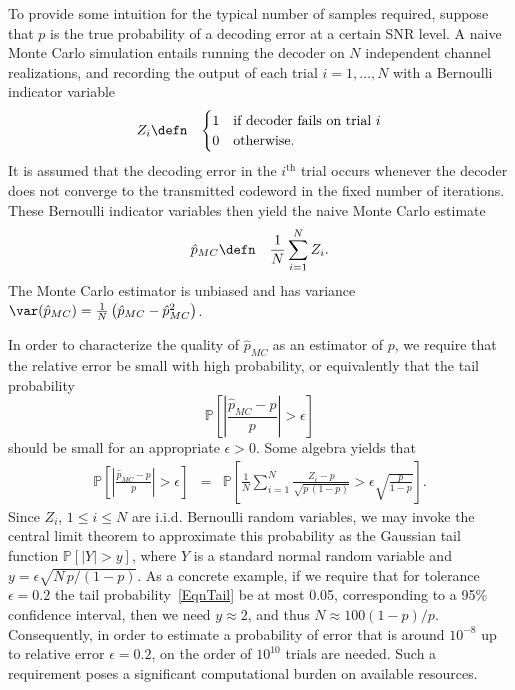 To provide some intuition for the typical number of samples required,
suppose that $p$ is the true probability of a decoding error at a
certain SNR level. A naive Monte Carlo simulation entails running the
decoder on $N$ independent channel realizations, and recording the
output of each trial $i= 1, \ldots, N$ with a Bernoulli indicator
variable
\begin{eqnarray*}
Z_i & \defn & \begin{cases} 1 & \mbox{if decoder fails on trial $i$} \\
                         0 & \mbox{otherwise.}
       \end{cases}
\end{eqnarray*}
It is assumed that the decoding error in the $i^\text{th}$ trial
occurs whenever the decoder does not converge to the transmitted
codeword in the fixed number of iterations.  These Bernoulli indicator
variables then yield the naive Monte Carlo estimate
\begin{eqnarray}
\label{EqnNaiveMC}
\hat{p}_{MC} & \defn & \frac{1}{N}\sum_{i=1}^N Z_i.
\end{eqnarray}
The Monte Carlo estimator is unbiased and has variance
$\var(\hat{p}_{MC})=\frac{1}{N}\left(\hat{p}_{MC}-\hat{p}_{MC}^2\right)$.

In order to characterize the quality of $\hat{p}_{MC}$ as an estimator
of $p$, we require that the relative error be small with high
probability, or equivalently that the tail probability
\begin{equation}
\label{EqnTail}
\mathbb{P} \left[ \left|\frac{\hat{p}_{MC}-p}{p}\right| > \epsilon
\right]
\end{equation}
should be small for an appropriate $\epsilon > 0$.  Some algebra
yields that
\begin{eqnarray*}
\mathbb{P} \left[ \left|\frac{\hat{p}_{MC}-p}{p}\right| > \epsilon
\right] & = & \mathbb{P} \left[ \frac{1}{N}\sum_{i=1}^N
\frac{Z_i-p}{\sqrt{p \,(1-p)}}> \epsilon \sqrt{\frac{p}{1-p}} \right].
\end{eqnarray*}
Since $Z_i$, $1 \leq i \leq N$ are i.i.d. Bernoulli random variables,
we may invoke the central limit theorem to approximate this
probability as the Gaussian tail function $\mathbb{P} [\left| Y
\right| > y]$, where $Y$ is a standard normal random variable and
\mbox{$y= \epsilon \sqrt{N \, p/(1-p)}$.}  As a concrete example, if
we require that for tolerance $\epsilon = 0.2$ the tail
probability~\eqref{EqnTail} be at most 0.05, corresponding to a 95\%
confidence interval, then we need $y \approx 2$, and thus $N \approx
100 (1-p)/p$. Consequently, in order to estimate a probability of
error that is around $10^{-8}$ up to relative error $\epsilon = 0.2$,
on the order of $10^{10}$ trials are needed. Such a requirement poses
a significant computational burden on available resources.


